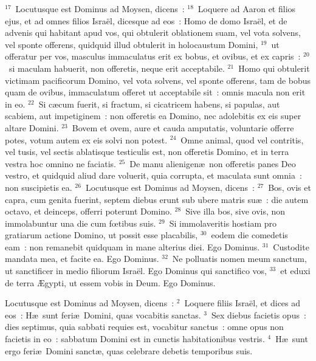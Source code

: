 ${}^{17}$~Locutusque est Dominus ad Moysen, dicens~:
${}^{18}$~Loquere ad Aaron et filios ejus, et ad omnes filios Isra\"el, dicesque ad eos~: Homo de domo Isra\"el, et de advenis qui habitant apud vos, qui obtulerit oblationem suam, vel vota solvens, vel sponte offerens, quidquid illud obtulerit in holocaustum Domini,
${}^{19}$~ut offeratur per vos, masculus immaculatus erit ex bobus, et ovibus, et ex capris~:
${}^{20}$~si maculam habuerit, non offeretis, neque erit acceptabile.
${}^{21}$~Homo qui obtulerit victimam pacificorum Domino, vel vota solvens, vel sponte offerens, tam de bobus quam de ovibus, immaculatum offeret ut acceptabile sit~: omnis macula non erit in eo.
${}^{22}$~Si c\ae cum fuerit, si fractum, si cicatricem habens, si papulas, aut scabiem, aut impetiginem~: non offeretis ea Domino, nec adolebitis ex eis super altare Domini.
${}^{23}$~Bovem et ovem, aure et cauda amputatis, voluntarie offerre potes, votum autem ex eis solvi non potest.
${}^{24}$~Omne animal, quod vel contritis, vel tusis, vel sectis ablatisque testiculis est, non offeretis Domino, et in terra vestra hoc omnino ne faciatis.
${}^{25}$~De manu alienigen\ae\ non offeretis panes Deo vestro, et quidquid aliud dare voluerit, quia corrupta, et maculata sunt omnia~: non suscipietis ea.
${}^{26}$~Locutusque est Dominus ad Moysen, dicens~:
${}^{27}$~Bos, ovis et capra, cum genita fuerint, septem diebus erunt sub ubere matris su\ae~: die autem octavo, et deinceps, offerri poterunt Domino.
${}^{28}$~Sive illa bos, sive ovis, non immolabuntur una die cum fœtibus suis.
${}^{29}$~Si immolaveritis hostiam pro gratiarum actione Domino, ut possit esse placabilis,
${}^{30}$~eodem die comedetis eam~: non remanebit quidquam in mane alterius diei. Ego Dominus.
${}^{31}$~Custodite mandata mea, et facite ea. Ego Dominus.
${}^{32}$~Ne polluatis nomen meum sanctum, ut sanctificer in medio filiorum Isra\"el. Ego Dominus qui sanctifico vos,
${}^{33}$~et eduxi de terra \AE gypti, ut essem vobis in Deum. Ego Dominus.

\lettrine[lines=3,image=true,loversize=0.05,lraise=-0.03]{L}{}ocutusque est Dominus ad Moysen, dicens~:
${}^{2}$~Loquere filiis Isra\"el, et dices ad eos~: H\ae\ sunt feri\ae\ Domini, quas vocabitis sanctas.
${}^{3}$~Sex diebus facietis opus~: dies septimus, quia sabbati requies est, vocabitur sanctus~: omne opus non facietis in eo~: sabbatum Domini est in cunctis habitationibus vestris.
${}^{4}$~H\ae\ sunt ergo feri\ae\ Domini sanct\ae , quas celebrare debetis temporibus suis.



